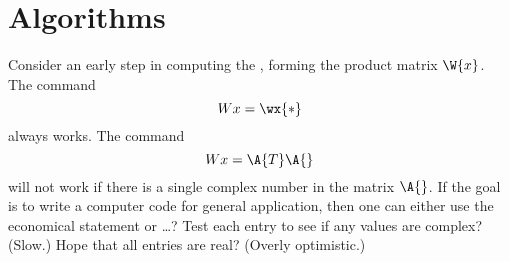 \section{Algorithms}
Consider an early step in computing the \asvd, forming the product matrix $\W{x}$. The command
\begin{equation}
  Wx = \wx{*}
\end{equation}
always works. The command
\begin{equation}
  Wx = \A{T}\A{}
\end{equation}
will not work if there is a single complex number in the matrix $\A{}$. If the goal is to write a computer code for general application, then one can either use the economical statement or \dots? Test each entry to see if any values are complex? (Slow.) Hope that all entries are real? (Overly optimistic.)


\endinput
